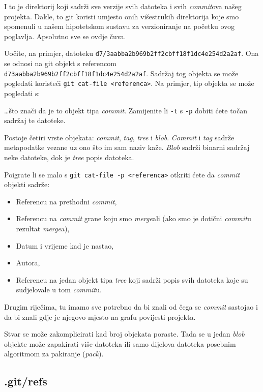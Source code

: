 I to je direktorij koji sadrži sve verzije svih datoteka i svih \emph{commit}ova našeg projekta.
Dakle, to git koristi umjesto onih višestrukih direktorija koje smo spomenuli u našem hipotetskom sustavu za verzioniranje na početku ovog poglavlja.
Apsolutno sve se ovdje čuva.

Uočite, na primjer, datoteku \verb+d7/3aabba2b969b2ff2cbff18f1dc4e254d2a2af+.
Ona se odnosi na git objekt s referencom \verb+d73aabba2b969b2ff2cbff18f1dc4e254d2a2af+.
Sadržaj tog objekta se može pogledati koristeći \verb+git cat-file <referenca>+.
Na primjer, tip objekta se može pogledati s:



\dots{}što znači da je to objekt tipa \emph{commit}.
Zamijenite li \verb+-t+ s \verb+-p+ dobiti ćete točan sadržaj te datoteke.

Postoje četiri vrste objekata: \emph{commit}, \emph{tag}, \emph{tree} i \emph{blob}. 
\emph{Commit} i \emph{tag} sadrže metapodatke vezane uz ono što im sam naziv kaže.
\emph{Blob} sadrži binarni sadržaj neke datoteke, dok je \emph{tree} popis datoteka.

Poigrate li se malo s \verb+git cat-file -p <referenca>+ otkriti ćete da \emph{commit} objekti sadrže:

\begin{itemize}
	\item Referencu na prethodni \emph{commit},
	\item Referencu na \emph{commit} grane koju smo \emph{merge}ali (ako smo je dotični \emph{commit}u rezultat \emph{merge}a),
	\item Datum i vrijeme kad je nastao,
	\item Autora,
	\item Referencu na jedan objekt tipa \emph{tree} koji sadrži popis svih datoteka koje su sudjelovale u tom \emph{commit}u.
\end{itemize}

Drugim riječima, tu imamo sve potrebno da bi znali od čega se \emph{commit} sastojao i da bi znali gdje je njegovo mjesto na grafu povijesti projekta.

Stvar se može zakomplicirati kad broj objekata poraste.
Tada se u jedan \emph{blob} objekte može zapakirati više datoteka ili samo dijelova datoteka posebnim algoritmom za pakiranje (\emph{pack}).

\subsection*{.git/refs}

